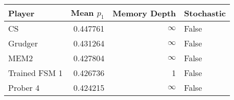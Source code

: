 \begin{tabular}{lrrl}
\toprule
        Player &  Mean $p_1$ &  Memory Depth & Stochastic \\
\midrule
            CS &    0.447761 &            \(\infty\) &      False \\
       Grudger &    0.431264 &            \(\infty\) &      False \\
          MEM2 &    0.427804 &            \(\infty\) &      False \\
 Trained FSM 1 &    0.426736 &             1 &      False \\
      Prober 4 &    0.424215 &            \(\infty\) &      False \\
\bottomrule
\end{tabular}
